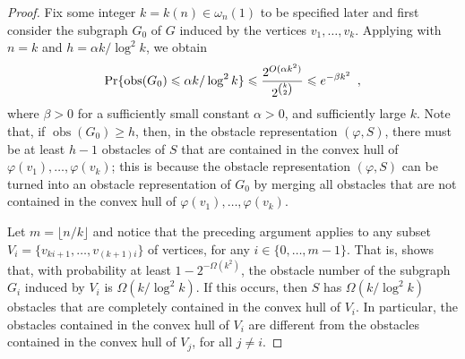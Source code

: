 \documentclass[12pt]{article}
\DeclareMathOperator{\obs}{obs}
\begin{document}
\begin{proof}
  Fix some integer $k=k(n)\in\omega_n(1)$ to be specified later and first
  consider the subgraph $G_0$ of $G$ induced by the vertices $v_1,\ldots,v_k$.
  Applying  with $n=k$ and $h=\alpha k/\log^2 k$,
  we obtain
  \begin{equation}
       \Pr\{\obs(G_0) \le \alpha k/\log^2 k\} 
         \le \frac{2^{O(\alpha k^2)}}{2^{\binom{k}{2}}}
         \le e^{-\beta k^2} \enspace , \eqlabel{g1}
  \end{equation}
  where $\beta>0$ for a sufficiently small constant $\alpha > 0$,
  and sufficiently large $k$.  Note that, if $\obs(G_0)\ge h$, then,
  in the obstacle representation $(\varphi,S)$, there must be at
  least $h-1$ obstacles of $S$ that are contained in the convex hull
  of $\varphi(v_1),\ldots,\varphi(v_k)$;  this is because the obstacle
  representation $(\varphi,S)$ can be turned into an obstacle representation
  of $G_0$ by merging all obstacles that are not contained in the convex
  hull of $\varphi(v_1),\ldots,\varphi(v_k)$.


  Let $m=\lfloor n/k\rfloor$ and notice that the preceding argument
  applies to any subset $V_i=\{v_{ki+1},\ldots,v_{(k+1)i}\}$ of vertices,
  for any $i\in\{0,\ldots,m-1\}$.  That is,  shows that,
  with probability at least $1-2^{-\Omega(k^2)}$, the obstacle number of
  the subgraph $G_i$ induced by $V_i$ is $\Omega(k/\log^2 k)$.  If this
  occurs, then $S$ has $\Omega(k/\log^2 k)$ obstacles that are completely
  contained in the convex hull of $V_i$.   In particular, the obstacles
  contained in the convex hull of $V_i$ are different from the obstacles
  contained in the convex hull of $V_j$, for all $j\neq i$.


\end{proof}
\end{document}
